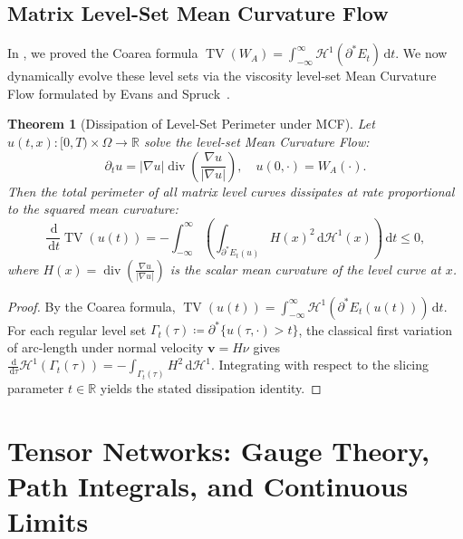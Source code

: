 \documentclass[11pt,a4paper,reqno]{amsart}
\newtheorem{theorem}{Theorem}[section]
\theoremstyle{definition}
\numberwithin{equation}{section}
\providecommand{\R}{\mathbb{R}}
\providecommand{\TV}{\operatorname{TV}}
\newcommand{\dif}{\,\mathrm{d}}
\providecommand{\R}{\mathbb{R}}
\providecommand{\TV}{\mathrm{TV}}
\begin{document}
\subsection{Matrix Level-Set Mean Curvature Flow}
In \cite{silvafilho2026functional}, we proved the Coarea formula $\TV(W_A) = \int_{-\infty}^\infty \mathcal{H}^1(\partial^* E_t) \dif t$. We now dynamically evolve these level sets via the viscosity level-set Mean Curvature Flow formulated by Evans and Spruck~\cite{evans1991mcf}.

\begin{theorem}[Dissipation of Level-Set Perimeter under MCF]
\label{thm:mean_curvature_coarea}
Let $u(t, x) \colon [0, T) \times \Omega \to \R$ solve the level-set Mean Curvature Flow:
\begin{equation}
    \label{eq:mcf_pde}
    \partial_t u = |\nabla u| \operatorname{div}\left( \frac{\nabla u}{|\nabla u|} \right), \quad u(0, \cdot) = W_A(\cdot).
\end{equation}
Then the total perimeter of all matrix level curves dissipates at rate proportional to the squared mean curvature:
\begin{equation}
    \frac{\dif}{\dif t} \TV(u(t)) = -\int_{-\infty}^\infty \left( \int_{\partial^* E_t(u)} H(x)^2 \dif \mathcal{H}^1(x) \right) \dif t \le 0,
\end{equation}
where $H(x) = \operatorname{div}(\frac{\nabla u}{|\nabla u|})$ is the scalar mean curvature of the level curve at $x$.
\end{theorem}
\begin{proof}
By the Coarea formula, $\TV(u(t)) = \int_{-\infty}^\infty \mathcal{H}^1(\partial^* E_t(u(t))) \dif t$. For each regular level set $\Gamma_t(\tau) \coloneqq \partial^* \{u(\tau, \cdot) > t\}$, the classical first variation of arc-length under normal velocity $\mathbf{v} = H \nu$ gives $\frac{\dif}{\dif \tau} \mathcal{H}^1(\Gamma_t(\tau)) = -\int_{\Gamma_t(\tau)} H^2 \dif \mathcal{H}^1$. Integrating with respect to the slicing parameter $t \in \R$ yields the stated dissipation identity.
\end{proof}

\section{Tensor Networks: Gauge Theory, Path Integrals, and Continuous Limits}
\label{sec:tensor_networks}
\end{document}
